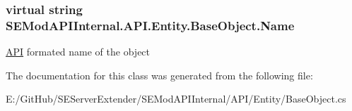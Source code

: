\subsubsection[{Name}]{\setlength{\rightskip}{0pt plus 5cm}virtual string S\+E\+Mod\+A\+P\+I\+Internal.\+A\+P\+I.\+Entity.\+Base\+Object.\+Name\hspace{0.3cm}{\ttfamily [get]}}\label{class_s_e_mod_a_p_i_internal_1_1_a_p_i_1_1_entity_1_1_base_object_ad5da23e54b967012eebf44069168532a}


\hyperlink{namespace_s_e_mod_a_p_i_internal_1_1_a_p_i}{A\+P\+I} formated name of the object 



The documentation for this class was generated from the following file\+:\begin{DoxyCompactItemize}
\item 
E\+:/\+Git\+Hub/\+S\+E\+Server\+Extender/\+S\+E\+Mod\+A\+P\+I\+Internal/\+A\+P\+I/\+Entity/Base\+Object.\+cs\end{DoxyCompactItemize}
